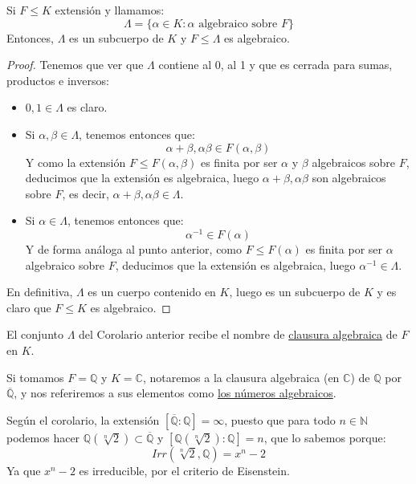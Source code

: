 \begin{coro}
    Si $F\leq K$ extensión y llamamos:
    \begin{equation*}
        \Lambda = \{\alpha\in K : \alpha \text{\ algebraico sobre\ } F\}
    \end{equation*}
    Entonces, $\Lambda$ es un subcuerpo de $K$ y $F\leq \Lambda$ es algebraico.
    \begin{proof}
        Tenemos que ver que $\Lambda$ contiene al 0, al 1 y que es cerrada para sumas, productos e inversos:
        \begin{itemize}
            \item $0,1\in \Lambda$ es claro.
            \item Si $\alpha,\beta\in \Lambda$, tenemos entonces que:
                \begin{equation*}
                    \alpha+\beta, \alpha\beta\in F(\alpha,\beta)
                \end{equation*}
                Y como la extensión $F\leq F(\alpha,\beta)$ es finita por ser $\alpha$ y $\beta$ algebraicos sobre $F$, deducimos que la extensión es algebraica, luego $\alpha+\beta,\alpha\beta$ son algebraicos sobre $F$, es decir, $\alpha+\beta,\alpha\beta\in \Lambda$.
            \item Si $\alpha\in \Lambda$, tenemos entonces que:
                \begin{equation*}
                    \alpha^{-1}\in F(\alpha)
                \end{equation*}
                Y de forma análoga al punto anterior, como $F\leq F(\alpha)$ es finita por ser $\alpha$ algebraico sobre $F$, deducimos que la extensión es algebraica, luego $\alpha^{-1}\in \Lambda$. 
        \end{itemize}
        En definitiva, $\Lambda$ es un cuerpo contenido en $K$, luego es un subcuerpo de $K$ y es claro que $F\leq K$ es algebraico.
    \end{proof}
\end{coro}

\begin{definicion}
    El conjunto $\Lambda$ del Corolario anterior recibe el nombre de \underline{clausura algebraica} de $F$ en $K$.
\end{definicion}

\begin{ejemplo}
    Si tomamos $F = \mathbb{Q}$ y $K = \mathbb{C}$, notaremos a la clausura algebraica (en $\mathbb{C}$) de $\mathbb{Q}$ por $\overline{\mathbb{Q}}$, y nos referiremos a sus elementos como \underline{los números algebraicos}.

    \noindent
    Según el corolario, la extensión $\left[\overline{\mathbb{Q}}: \mathbb{Q}\right] = \infty$, puesto que para todo $n\in \mathbb{N}$ podemos hacer $\mathbb{Q}(\sqrt[n]{2}) \subset \overline{\mathbb{Q}}$ y $[\mathbb{Q}(\sqrt[n]{2}):\mathbb{Q}] = n$, que lo sabemos porque:
    \begin{equation*}
        Irr\left(\sqrt[n]{2}, \mathbb{Q}\right) = x^n - 2
    \end{equation*}
    Ya que $x^n-2$ es irreducible, por el criterio de Eisenstein.
\end{ejemplo}

